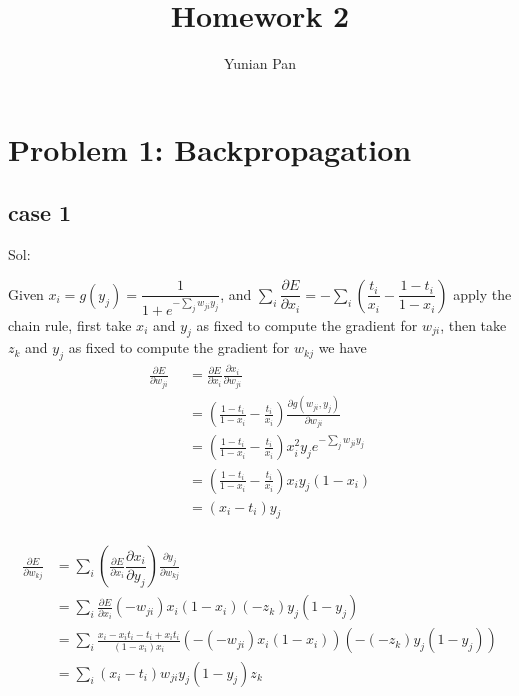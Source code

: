 \documentclass[a4paper,12pt]{article}
\begin{document}
\title{\textbf{Homework 2}}
\author{Yunian Pan}
\maketitle{}

\section{Problem 1: Backpropagation}

\subsection{case 1}

Sol: 

Given $x_i = g(y_j) = \dfrac{1}{1+e^{-\sum_j {w_{ji}y_j}}}$, and $\sum_{i}\dfrac{\partial E}{\partial x_i} = -\sum_i {(\dfrac{t_i}{x_i} - \dfrac{1 - t_i}{1 - x_i})}$ apply the chain rule, first take $x_i$ and $y_j$ as fixed to compute the gradient for $w_{ji}$, then take $z_k$ and $y_j$ as fixed to compute the gradient for $w_{kj}$ we have 
\begin{align}
\frac{\partial E}{\partial w_{ji}} & = \frac{\partial E}{\partial x_i}\frac{\partial x_i}{\partial w_{ji}}\nonumber \\
&= (\frac{1-t_i}{1- x_i} - \frac{t_i}{x_i})\frac{\partial g(w_{ji}, y_j) }{\partial w_{ji}} \nonumber \\
& = (\frac{1-t_i}{1- x_i} - \frac{t_i}{x_i}) x^2_i y_{j} e^{-\sum_j{w_{ji}y_j}} \nonumber \\
& = (\frac{1-t_i}{1- x_i} - \frac{t_i}{x_i}) x_i y_{j} (1-x_i) \nonumber \\
& = (x_i - t_i) y_j \nonumber \\
\qquad \nonumber 
\end{align}

\begin{align}
\frac{\partial E}{\partial w_{kj}} & =  \sum_{i} (\frac{\partial E}{\partial x_i}  \dfrac{\partial x_i}{\partial y_j} )\frac{\partial y_j}{\partial w_{kj}} \nonumber \\
& =  \sum_{i} \frac{\partial E}{\partial x_i}(-w_{ji}) x_i (1 - x_i) (-z_k) y_j(1- y_j)\nonumber  \\
& = \sum_{i} \frac{x_i - x_i t_i - t_i + x_i t_i}{ (1-x_i)x_i } (-(-w_{ji}) x_i (1 - x_i))(- (-z_k) y_j(1- y_j)) \nonumber \\
& = \sum_{i} (x_i - t_i) w_{ji} y_j(1- y_j) z_k \nonumber 
\end{align}
\end{document}
